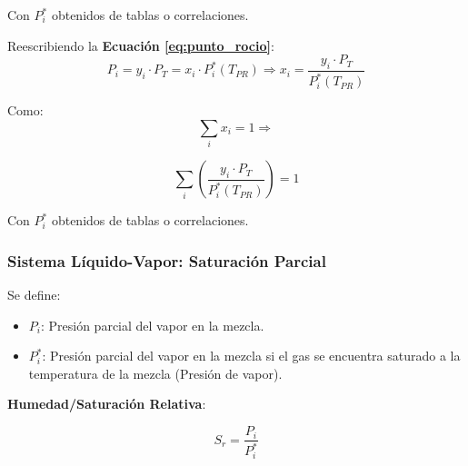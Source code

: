             Con \(P_{i}^{*}\) obtenidos de tablas o correlaciones.
        
            
            \begin{quote}
                \textit{}
            \end{quote}
            
            Reescribiendo la \textbf{Ecuación \ref{eq:punto_rocio}}:
            \[P_{i} = y_{i}\cdot P_{T} = x_{i} \cdot P_{i}^{*}\left ( T_{PR} \right ) \Rightarrow x_{i} = \frac{y_{i}\cdot P_{T}}{P_{i}^{*}\left ( T_{PR} \right )}\]
            
            Como:
            \[\sum_{i}x_{i} = 1 \Rightarrow\]
            
            \begin{equation}
            \label{eq:punto_rocio_2}
                \sum_{i} \left ( \frac{y_{i}\cdot P_{T}}{P_{i}^{*}\left ( T_{PR} \right )} \right ) = 1
            \end{equation}
            
            Con \(P_{i}^{*}\) obtenidos de tablas o correlaciones.
        
        \subsubsection{Sistema Líquido-Vapor: Saturación Parcial}
        
            
            Se define:
            
            \begin{itemize}
                \item \(P_{i}\): Presión parcial del vapor en la mezcla.
                \item \(P_{i}^{*}\): Presión parcial del vapor en la mezcla si el gas se encuentra saturado a la temperatura de la mezcla (Presión de vapor).
            \end{itemize}
            
            \textbf{Humedad/Saturación Relativa}:
            
            \begin{equation}
            \label{eq:humedad_relativa}
                S_{r} = \frac{P_{i}}{P_{i}^{*}}
            \end{equation}
            
